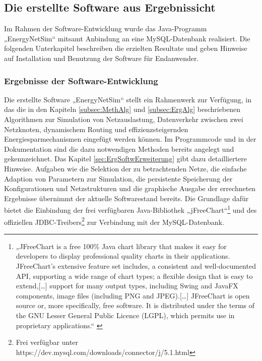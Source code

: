 \documentclass[12pt,titlepage]{article}
\begin{document}


\subsection{Die erstellte Software aus Ergebnissicht}
Im Rahmen der Software-Entwicklung wurde das Java-Programm „EnergyNetSim“ mitsamt Anbindung an eine MySQL-Datenbank realisiert. Die folgenden Unterkapitel beschreiben die erzielten Resultate und geben Hinweise auf Installation und Benutzung der Software für Endanwender.

\subsubsection{Ergebnisse der Software-Entwicklung}
Die erstellte Software „EnergyNetSim“ stellt ein Rahmenwerk zur Verfügung, in das die in den Kapiteln
\ref{subsec:MethAlg} und \ref{subsec:ErgAlg} beschriebenen Algorithmen zur Simulation von Netzauslastung, Datenverkehr zwischen zwei Netzknoten, dynamischem Routing und effizienzsteigernden Energiesparmechanismen eingefügt werden können. Im Programmcode und in der Dokumentation sind die dazu notwendigen Methoden bereits angelegt und gekennzeichnet. Das Kapitel \ref{sec:ErgSoftwErweiterung} gibt dazu detailliertere Hinweise.
Aufgaben wie die Selektion der zu betrachtenden Netze, die einfache Adaption von Parametern zur Simulation, die persistente Speicherung der Konfigurationen und Netzstrukturen und die graphische Ausgabe der errechneten Ergebnisse übernimmt der aktuelle Softwarestand bereits. Die Grundlage dafür bietet die Einbindung der frei verfügbaren Java-Bibliothek „jFreeChart“\footnote{„JFreeChart is a free 100\% Java chart library that makes it easy for developers to display professional quality charts in their applications. JFreeChart's extensive feature set includes, a consistent and well-documented API, supporting a wide range of chart types; a flexible design that is easy to extend,[…] support for many output types, including Swing and JavaFX components, image files (including PNG and JPEG).[…] JFreeChart is open source or, more specifically, free software. It is distributed under the terms of the GNU Lesser General Public Licence (LGPL), which permits use in proprietary applications.“ \cite{jdbc}} und des offiziellen JDBC-Treibers\footnote{Frei verfügbar unter https://dev.mysql.com/downloads/connector/j/5.1.html} zur Verbindung mit der MySQL-Datenbank.
\end{document}
